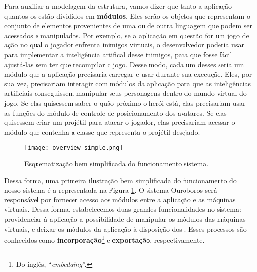     Para auxiliar a modelagem da estrutura, vamos dizer que tanto a aplicação
    quantos os  estão divididos em \textbf{módulos}. Eles serão os
    objetos que representam o conjunto de elementos provenientes de uma ou de
    outra linguagem que podem ser acessados e manipulados. Por exemplo, se a
    aplicação em questão for um jogo de ação no qual o jogador enfrenta inimigos
    virtuais, o desenvolvedor poderia usar  para implementar a
    inteligência artifical desse inimigos, para que fosse fácil ajustá-las sem
    ter que recompilar o jogo. Desse modo, cada um desses  seria um
    módulo que a aplicação precisaria carregar e usar durante sua execução.
    Eles, por sua vez, precisariam interagir com módulos da aplicação para que
    as inteligências artificiais conseguissem manipular seus personagens dentro
    do mundo virtual do jogo. Se elas quisessem saber o quão próximo o herói
    está, elas precisariam usar as funções do módulo de controle de
    posicionamento dos avatares. Se elas quisessem criar um projétil para atacar
    o jogador, elas precisariam acessar o módulo que contenha a
    classe\footnotemark{} que representa o projétil desejado.


    \begin{figure}[ht]
      \centering
      \texttt{[image: overview-simple.png]}
      \caption{Esquematização bem simplificada do funcionamento sistema.}
      \label{fig:overview-simple}
    \end{figure}

    Dessa forma, uma primeira ilustração bem simplificada do funcionamento do
    nosso sistema é a representada na Figura \ref{fig:overview-simple}. O
    sistema Ouroboros será responsável por fornecer acesso aos módulos entre a
    aplicação e as máquinas virtuais. Dessa forma, estabelecemos duas
    grandes funcionalidades no sistema: providenciar à aplicação a possibilidade
    de manipular os módulos das máquinas virtuais, e deixar os módulos da
    aplicação à disposição dos  . Esses processos são conhecidos como
    \textbf{incorporação}\footnote{Do inglês, ``\textit{embedding}''.} e
    \textbf{exportação}, respectivamente.



